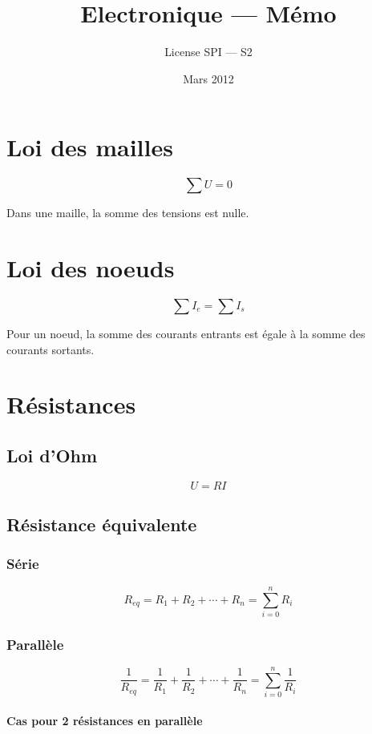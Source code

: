 \documentclass[a4paper, 11pt]{article}
\title{Electronique — Mémo}
\author{License SPI — S2}
\date{Mars 2012}
\begin{document}
    \maketitle

    \section{Loi des mailles}

    $$\sum U = 0$$

    Dans une maille, la somme des tensions est nulle.

    \section{Loi des noeuds}

    $$\sum I_e = \sum I_s$$

    Pour un noeud, la somme des courants entrants est égale à la somme des courants sortants.

    \section{Résistances}

        \subsection{Loi d'Ohm}

        $$U=RI$$

        \subsection{Résistance équivalente}

        \subsubsection{Série}

        $$R_{eq} = R_1 + R_2 + \cdots + R_n = \sum_{i=0}^n R_i$$

        \subsubsection{Parallèle}

        $$\frac{1}{R_{eq}} = \frac{1}{R_1} + \frac{1}{R_2} + \cdots + \frac{1}{R_n} = \sum_{i=0}^n \frac{1}{R_i}$$

        \paragraph{Cas pour 2 résistances en parallèle}
\end{document}
